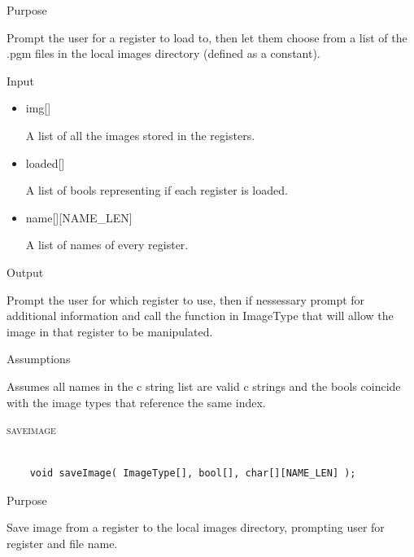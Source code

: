 \documentclass[pdftex, 11pt]{article}
\begin{document}
\begin{description}
		\begin{description}
			\item{Purpose}

				Prompt the user for a register to load to, then let them choose from a list
				of the .pgm files in the local images directory (defined as a constant).

			\item{Input}

				\begin{itemize}

					\item{img[]}

						A list of all the images stored in the registers.

					\item{loaded[]}

						A list of bools representing if each register is loaded.

					\item{name[][NAME\_LEN]}

						A list of names of every register.

				\end{itemize}

			\item{Output}

				Prompt the user for which register to use, then if nessessary
				prompt for additional information and call the function
				in ImageType that will allow the image in that register to
				be manipulated.

			\item{Assumptions}

				Assumes all names in the c string list are valid c
				strings and the bools coincide with the image types that
				reference the same index.

		\end{description}



	\item{\textsc{saveimage}}

		\begin{lstlisting}

	void saveImage( ImageType[], bool[], char[][NAME_LEN] );
		\end{lstlisting}

		\begin{description}
			\item{Purpose}

				Save image from a register to the local images directory, prompting user for
				register and file name.


\end{description}
\end{description}
\end{document}
